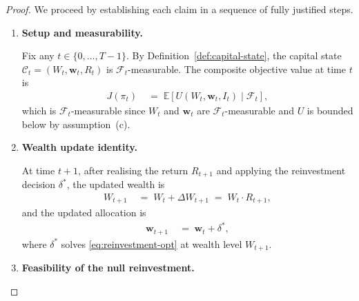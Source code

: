 \documentclass[12pt,openany]{book}
\newcommand{\bfw}{\mathbf{w}}
\newcommand{\calF}{\mathcal{F}}
\newcommand{\calI}{\mathcal{I}}
\newcommand{\E}{\mathbb{E}}
\numberwithin{equation}{chapter}
\theoremstyle{plain}
\theoremstyle{definition}
\theoremstyle{remark}
\numberwithin{equation}{chapter}
\theoremstyle{plain}
\newcommand{\calR}{\mathcal{R}}
\newcommand{\calC}{\mathcal{C}}
\def\calI{I}%
\def\calR{R}%
\begin{document}
\begin{proof}
We proceed by establishing each claim in a sequence of
fully justified steps.

\begin{enumerate}

  \item[\textup{(1)}] \textbf{Setup and measurability.}

        Fix any $t \in \{0,\ldots,T-1\}$.
        By Definition~\ref{def:capital-state}, the capital state
        $\calC_t = (W_t, \bfw_t, \calR_t)$ is $\calF_t$-measurable.
        The composite objective value at time $t$ is
        \begin{align}
          J(\pi_t)
          &\;=\; \E\!\left[
            U(W_t, \bfw_t, \calI_t) \mid \calF_t
          \right],
          \label{eq:Jt-def}
        \end{align}
        which is $\calF_t$-measurable since $W_t$ and $\bfw_t$
        are $\calF_t$-measurable and $U$ is bounded below by
        assumption~(c).

  \item[\textup{(2)}] \textbf{Wealth update identity.}

        At time $t+1$, after realising the return $R_{t+1}$ and
        applying the reinvestment decision $\delta^*$, the updated
        wealth is
        \begin{align}
          W_{t+1}
          &\;=\; W_t + \Delta W_{t+1}
           \;=\; W_t \cdot R_{t+1},
          \label{eq:wealth-update}
        \end{align}
        and the updated allocation is
        \begin{align}
          \bfw_{t+1}
          &\;=\; \bfw_t + \delta^*,
          \label{eq:alloc-update}
        \end{align}
        where $\delta^*$ solves \eqref{eq:reinvestment-opt} at
        wealth level $W_{t+1}$.

  \item[\textup{(3)}] \textbf{Feasibility of the null reinvestment.}


\end{enumerate}
\end{proof}
\end{document}
